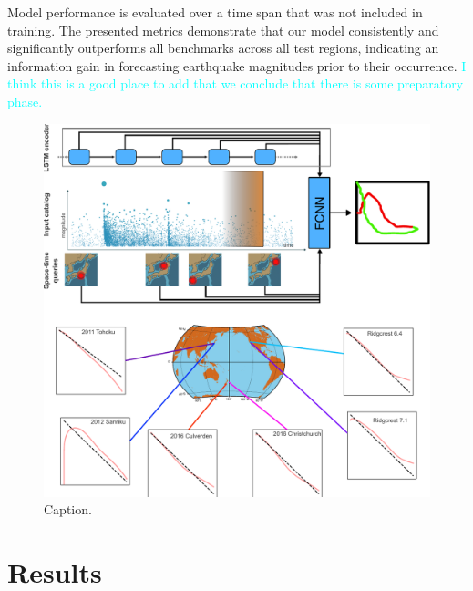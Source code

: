 \documentclass[pdflatex]{sn-jnl}
\newcommand{\neri}[1]{{\textcolor{cyan}{#1}}}
\begin{document}
Model performance is evaluated over a time span that was not included in training. The presented metrics demonstrate that our model consistently and significantly outperforms all benchmarks across all test regions, indicating an information gain in forecasting earthquake magnitudes prior to their occurrence. \neri{I think this is a good place to add that we conclude that there is some preparatory phase.}

\begin{figure}[h!]
	\centering
        \includegraphics[width=1\textwidth]{figures/intro_fig.pdf}
	\caption{
 Caption.
}
\label{fig:intro_fig}
\end{figure}



\section{Results} \label{sec:results}
\end{document}
